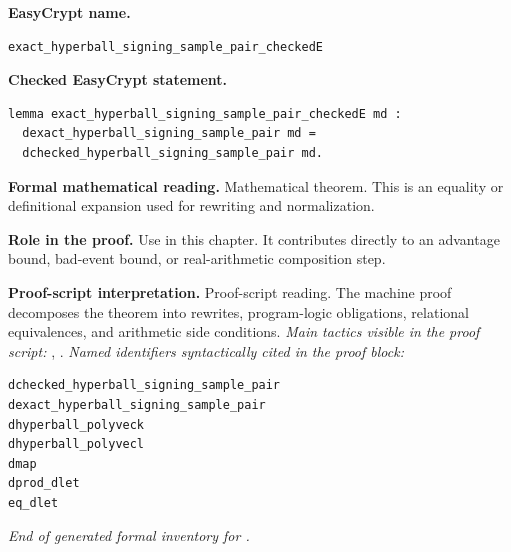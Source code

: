 \begin{formaltheorem}
\noindent\textbf{EasyCrypt name.}
\begin{lstlisting}[language=EasyCrypt,basicstyle=\ttfamily\scriptsize]
exact_hyperball_signing_sample_pair_checkedE
\end{lstlisting}
\noindent\textbf{Checked EasyCrypt statement.}
\begin{lstlisting}[language=EasyCrypt,basicstyle=\ttfamily\scriptsize]
lemma exact_hyperball_signing_sample_pair_checkedE md :
  dexact_hyperball_signing_sample_pair md =
  dchecked_hyperball_signing_sample_pair md.
\end{lstlisting}
\noindent\textbf{Formal mathematical reading.}
Mathematical theorem. This is an equality or definitional expansion used for rewriting and normalization.

\noindent\textbf{Role in the proof.}
Use in this chapter. It contributes directly to an advantage bound, bad-event bound, or real-arithmetic composition step.

\noindent\textbf{Proof-script interpretation.}
Proof-script reading. The machine proof decomposes the theorem into rewrites, program-logic obligations, relational equivalences, and arithmetic side conditions.
\emph{Main tactics visible in the proof script:} , .
\emph{Named identifiers syntactically cited in the proof block:}
\begin{lstlisting}[language=EasyCrypt,basicstyle=\ttfamily\scriptsize]
dchecked_hyperball_signing_sample_pair
dexact_hyperball_signing_sample_pair
dhyperball_polyveck
dhyperball_polyvecl
dmap
dprod_dlet
eq_dlet
\end{lstlisting}

\end{formaltheorem}

\medskip
\noindent\emph{End of generated formal inventory for .}
